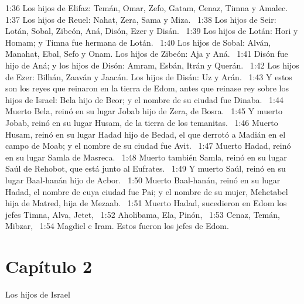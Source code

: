 1:36 Los hijos de Elifaz: Temán, Omar, Zefo, Gatam, Cenaz, Timna y Amalec.  
1:37 Los hijos de Reuel: Nahat, Zera, Sama y Miza.  
1:38 Los hijos de Seir: Lotán, Sobal, Zibeón, Aná, Disón, Ezer y Disán.  
1:39 Los hijos de Lotán: Hori y Homam; y Timna fue hermana de Lotán.  
1:40 Los hijos de Sobal: Alván, Manahat, Ebal, Sefo y Onam. Los hijos de Zibeón: Aja y Aná.  
1:41 Disón fue hijo de Aná; y los hijos de Disón: Amram, Esbán, Itrán y Querán.  
1:42 Los hijos de Ezer: Bilhán, Zaaván y Jaacán. Los hijos de Disán: Uz y Arán.  
1:43 Y estos son los reyes que reinaron en la tierra de Edom, antes que reinase rey sobre los hijos de Israel: Bela hijo de Beor; y el nombre de su ciudad fue Dinaba.  
1:44 Muerto Bela, reinó en su lugar Jobab hijo de Zera, de Bosra.  
1:45 Y muerto Jobab, reinó en su lugar Husam, de la tierra de los temanitas.  
1:46 Muerto Husam, reinó en su lugar Hadad hijo de Bedad, el que derrotó a Madián en el campo de Moab; y el nombre de su ciudad fue Avit.  
1:47 Muerto Hadad, reinó en su lugar Samla de Masreca.  
1:48 Muerto también Samla, reinó en su lugar Saúl de Rehobot, que está junto al Eufrates.  
1:49 Y muerto Saúl, reinó en su lugar Baal-hanán hijo de Acbor.  
1:50 Muerto Baal-hanán, reinó en su lugar Hadad, el nombre de cuya ciudad fue Pai; y el nombre de su mujer, Mehetabel hija de Matred, hija de Mezaab.  
1:51 Muerto Hadad, sucedieron en Edom los jefes Timna, Alva, Jetet,  
1:52 Aholibama, Ela, Pinón,  
1:53 Cenaz, Temán, Mibzar,  
1:54 Magdiel e Iram. Estos fueron los jefes de Edom.  
\section*{Capítulo 2}
Los hijos de Israel  

